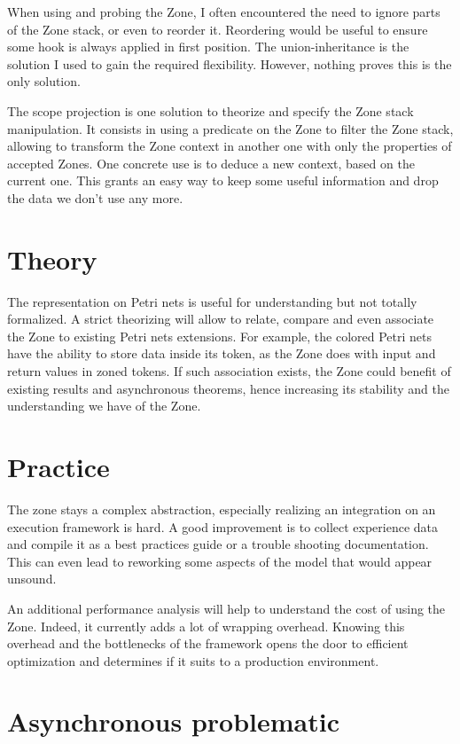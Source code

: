 When using and probing the Zone, I often encountered the need to ignore parts of the Zone stack, or even to reorder it. Reordering would be useful to ensure some hook is always applied in first position. The union-inheritance is the solution I used to gain the required flexibility. However, nothing proves this is the only solution. 

The scope projection is one solution to theorize and specify the Zone stack manipulation. It consists in using a predicate on the Zone to filter the Zone stack, allowing to transform the Zone context in another one with only the properties of accepted Zones. One concrete use is to deduce a new context, based on the current one. This grants an easy way to keep some useful information and drop the data we don't use any more.

\section{Theory}

The representation on Petri nets is useful for understanding but not totally formalized. A strict theorizing will allow to relate, compare and even associate the Zone to existing Petri nets extensions. For example, the colored Petri nets have the ability to store data inside its token, as the Zone does with input and return values in zoned tokens. If such association exists, the Zone could benefit of existing results and asynchronous theorems, hence increasing its stability and the understanding we have of the Zone.

\section{Practice}

The zone stays a complex abstraction, especially realizing an integration on an execution framework is hard. A good improvement is to collect experience data and compile it as a best practices guide or a trouble shooting documentation. This can even lead to reworking some aspects of the model that would appear unsound.

An additional performance analysis will help to understand the cost of using the Zone. Indeed, it currently adds a lot of wrapping overhead. Knowing this overhead and the bottlenecks of the framework opens the door to efficient optimization and determines if it suits to a production environment.



\section{Asynchronous problematic}

